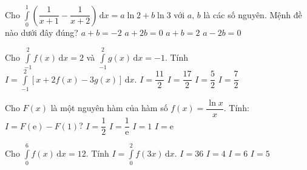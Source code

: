 \begin{ex}%
	Cho $\displaystyle\int\limits_0^1\left(\dfrac{1}{x+1}-\dfrac{1}{x+2}\right)\mathrm{\,d}x=a\ln 2+b\ln 3$ với $a,\,b$ là các số nguyên. Mệnh đề nào dưới đây đúng?
	\choice
	{$a+b=-2$}
	{\True $a+2b=0$}
	{$a+b=2$}
	{$a-2b=0$}
\end{ex}

\begin{ex}%
	Cho $\displaystyle\int\limits_{-1}^2 f(x)\mathrm{\,d}x=2$ và $\displaystyle\int\limits_{-1}^2 g(x)\mathrm{\,d}x=-1$. Tính $I=\displaystyle\int\limits_{-1}^2\left[x+2f(x)-3g(x)\right]\mathrm{\,d}x$. 
	\choice
	{$I=\dfrac{11}{2}$}
	{\True $I=\dfrac{17}{2}$}
	{$I=\dfrac{5}{2}$}
	{$I=\dfrac{7}{2}$}
\end{ex}

\begin{ex}%
	Cho $F(x)$ là một nguyên hàm của hàm số $f(x)=\dfrac{\ln x}{x}$. Tính: $I=F(\mathrm{e})-F(1)$?
	\choice
	{\True $I=\dfrac{1}{2}$}
	{$I=\dfrac{1}{\mathrm{e}}$}
	{$I=1$}
	{$I=\mathrm{e}$}
\end{ex}

\begin{ex}%
	Cho $\displaystyle\int\limits_0^6 f(x)\mathrm{\,d}x=12$. Tính $I=\displaystyle\int\limits_0^2 f(3x)\mathrm{\,d}x$. 
	\choice
	{$I=36$}
	{\True $I=4$}
	{$I=6$}
	{$I=5$}
\end{ex}

